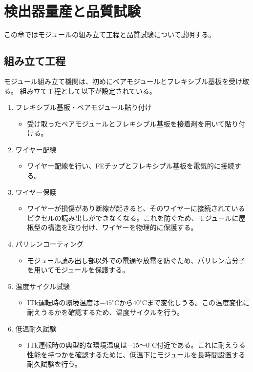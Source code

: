 \chapter{検出器量産と品質試験}
この章ではモジュールの組み立て工程と品質試験について説明する。

\section{組み立て工程}\label{sec:assembly}
モジュール組み立て機関は、初めにベアモジュールとフレキシブル基板を受け取る。
組み立て工程として以下が設定されている。
\begin{enumerate}
  \item フレキシブル基板・ベアモジュール貼り付け
  \begin{itemize}
    \item 受け取ったベアモジュールとフレキシブル基板を接着剤を用いて貼り付ける。
  \end{itemize}
  \item ワイヤー配線
  \begin{itemize}
    \item ワイヤー配線を行い、FEチップとフレキシブル基板を電気的に接続する。
  \end{itemize}
  \item ワイヤー保護
  \begin{itemize}
    \item ワイヤーが損傷があり断線が起きると、そのワイヤーに接続されているピクセルの読み出しができなくなる。これを防ぐため、モジュールに屋根型の構造を取り付け、ワイヤーを物理的に保護する。
  \end{itemize}
  \item パリレンコーティング
  \begin{itemize}
    \item モジュール読み出し部以外での電通や放電を防ぐため、パリレン高分子を用いてモジュールを保護する。
  \end{itemize}
  \item 温度サイクル試験
  \begin{itemize}
    \item ITk運転時の環境温度は$-45^\circ$Cから$40^\circ$Cまで変化しうる\cite{3-2}。この温度変化に耐えうるかを確認するため、温度サイクルを行う。
  \end{itemize}
  \item 低温耐久試験
  \begin{itemize}
    \item ITk運転時の典型的な環境温度は$-15〜0^\circ$C付近である。これに耐えうる性能を持つかを確認するために、低温下にモジュールを長時間設置する耐久試験を行う。
  \end{itemize}
\end{enumerate}

